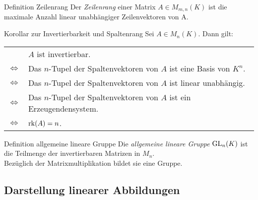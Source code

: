 \documentclass[main.tex]{subfiles}
\begin{document}
\begin{karte}{Definition Zeilenrang}
    Der \textit{Zeilenrang} einer Matrix \(A \in M_{m,n}(K)\) ist 
    die maximale Anzahl linear unabhängiger Zeilenvektoren von A.
\end{karte}
\begin{karte}{Korollar zur Invertierbarkeit und Spaltenrang}
    Sei \(A \in M_n(K)\). Dann gilt:\vspace{2mm}\\
    \begin{tabular}{rl}
        & \(A\) ist invertierbar.\vspace{1mm}\\
        \( \Leftrightarrow \) & Das \(n\)-Tupel der 
        Spaltenvektoren von \(A\) ist eine Basis von \(K^n\).\vspace{1mm}\\
        \( \Leftrightarrow \) & Das \(n\)-Tupel der 
        Spaltenvektoren von \(A\) ist linear unabhängig.\vspace{1mm}\\
        \( \Leftrightarrow \) & Das \(n\)-Tupel der 
        Spaltenvektoren von \(A\) ist ein Erzeugendensystem.\vspace{1mm}\\
        \( \Leftrightarrow \) & \(\operatorname{rk}(A) = n\).        
    \end{tabular}
\end{karte}
\begin{karte}{Definition allgemeine lineare Gruppe}
    Die \textit{allgemeine lineare Gruppe} \( \operatorname{GL}_n(K) \) ist die Teilmenge 
    der invertierbaren Matrizen in \(M_n\). \\ 
    Bezüglich der Matrixmultiplikation bildet sie eine Gruppe.
\end{karte}

\subsection*{Darstellung linearer Abbildungen}  
\end{document}
